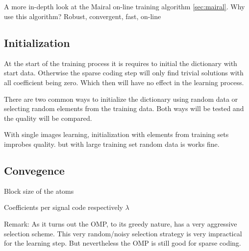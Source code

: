 

\subsection{\trainDL}
A more in-depth look at the Mairal on-line training algorithm \ref{sec:mairal}. 
Why use this algorithm? Robust, convergent, fast, on-line

\subsection{Initialization}
At the start of the training process it is requires to initial the
dictionary with start data. Otherwise the sparse coding step will only find
trivial solutions with all coefficient being zero. Which then will have no
effect in the learning process.

There are two common ways to initialize the dictionary using random data or
selecting random elements from the training data. Both ways will be tested and 
the quality will be compared.


With single images learning, initialization with elements from training sets
improbes quality. but with large training set random data is works fine.



\subsection{Convegence}

Block size of the atoms

Coefficients per signal code respectively $\lambda$


Remark:
As it turns out the OMP, to its greedy nature, has a very aggressive selection
scheme. This very random/noisy selection strategy is very impractical
for the \trainDL learning step. But nevertheless the OMP is still good for
sparse coding. 

